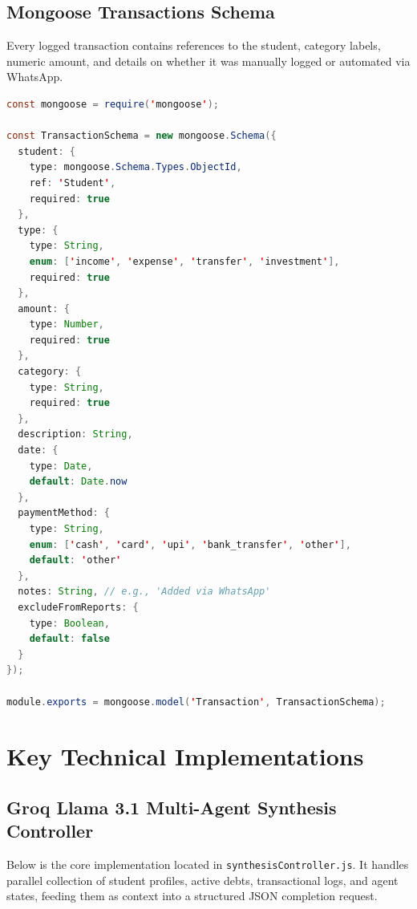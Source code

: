 \documentclass[11pt,a4paper]{article}
\begin{document}
\subsection{Mongoose Transactions Schema}
Every logged transaction contains references to the student, category labels, numeric amount, and details on whether it was manually logged or automated via WhatsApp.
\begin{lstlisting}[language=Java, caption=Transaction Data Model Schema, label=lst:transaction]
const mongoose = require('mongoose');

const TransactionSchema = new mongoose.Schema({
  student: {
    type: mongoose.Schema.Types.ObjectId,
    ref: 'Student',
    required: true
  },
  type: {
    type: String,
    enum: ['income', 'expense', 'transfer', 'investment'],
    required: true
  },
  amount: {
    type: Number,
    required: true
  },
  category: {
    type: String,
    required: true
  },
  description: String,
  date: {
    type: Date,
    default: Date.now
  },
  paymentMethod: {
    type: String,
    enum: ['cash', 'card', 'upi', 'bank_transfer', 'other'],
    default: 'other'
  },
  notes: String, // e.g., 'Added via WhatsApp'
  excludeFromReports: {
    type: Boolean,
    default: false
  }
});

module.exports = mongoose.model('Transaction', TransactionSchema);
\end{lstlisting}

\newpage
\section{Key Technical Implementations}

\subsection{Groq Llama 3.1 Multi-Agent Synthesis Controller}
Below is the core implementation located in \texttt{synthesisController.js}. It handles parallel collection of student profiles, active debts, transactional logs, and agent states, feeding them as context into a structured JSON completion request.
\end{document}
